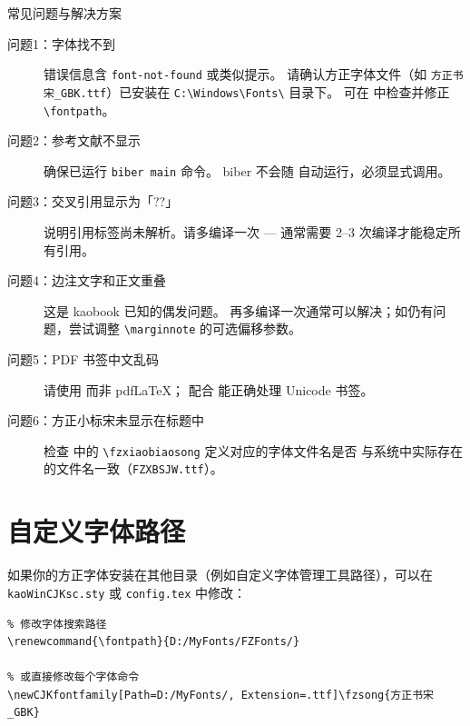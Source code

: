 \begin{sidebox}{常见问题与解决方案}
\begin{description}
    \item[问题1：字体找不到] 错误信息含 \texttt{font-not-found} 或类似提示。
    请确认方正字体文件（如 \texttt{方正书宋\_GBK.ttf}）已安装在
    \texttt{C:\textbackslash Windows\textbackslash Fonts\textbackslash} 目录下。
    可在  中检查并修正 \lstinline|\fontpath|。

    \item[问题2：参考文献不显示] 确保已运行 \texttt{biber main} 命令。
    biber 不会随 \XeLaTeX{} 自动运行，必须显式调用。

    \item[问题3：交叉引用显示为「??」] 说明引用标签尚未解析。请多编译一次
    —\XeLaTeX{} 通常需要 2--3 次编译才能稳定所有引用。

    \item[问题4：边注文字和正文重叠] 这是 kaobook 已知的偶发问题。
    再多编译一次通常可以解决；如仍有问题，尝试调整 \lstinline|\marginnote|
    的可选偏移参数。

    \item[问题5：PDF 书签中文乱码] 请使用 \XeLaTeX{} 而非 pdfLaTeX；
     配合 \XeLaTeX{} 能正确处理 Unicode 书签。

    \item[问题6：方正小标宋未显示在标题中] 检查 
    中的 \texttt{\textbackslash fzxiaobiaosong} 定义对应的字体文件名是否
    与系统中实际存在的文件名一致（\texttt{FZXBSJW.ttf}）。
\end{description}
\end{sidebox}


\section{自定义字体路径}

如果你的方正字体安装在其他目录（例如自定义字体管理工具路径），可以在
\texttt{kaoWinCJKsc.sty} 或 \texttt{config.tex} 中修改：

\begin{lstlisting}
% 修改字体搜索路径
\renewcommand{\fontpath}{D:/MyFonts/FZFonts/}

% 或直接修改每个字体命令
\newCJKfontfamily[Path=D:/MyFonts/, Extension=.ttf]\fzsong{方正书宋_GBK}
\end{lstlisting}

